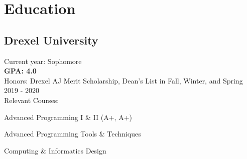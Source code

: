 \documentclass[]{deedy-resume-openfont}
\begin{document}
%
%
\lastupdated

%
%

%
%

\begin{minipage}[t]{0.33\textwidth} 


\section{Education} 
\subsection{Drexel University}
Current year: Sophomore \\
\textbf{GPA: 4.0} \\
Honors: Drexel AJ Merit Scholarship, Dean's List in Fall, Winter, and Spring 2019 - 2020 \\
Relevant Courses: \\
\vspace{\topsep} %
\begin{tightemize}
\item Advanced Programming I \& II (A+, A+)
\item Advanced Programming Tools \& Techniques
\item Computing \& Informatics Design
\end{tightemize}
\sectionsep


\end{minipage}
\end{document}
